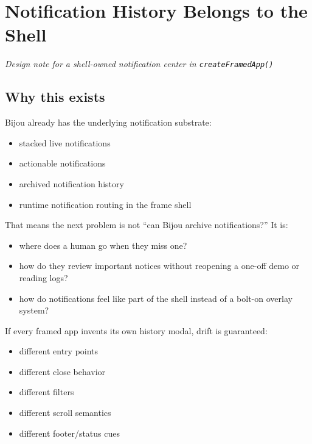 \chapter{Notification History Belongs to the Shell}\label{record-053}

\smallskip

\emph{Design note for a shell-owned notification center in \texttt{c\allowbreak{}r\allowbreak{}e\allowbreak{}a\allowbreak{}t\allowbreak{}e\allowbreak{}F\allowbreak{}r\allowbreak{}a\allowbreak{}m\allowbreak{}e\allowbreak{}d\allowbreak{}A\allowbreak{}p\allowbreak{}p\allowbreak{}(\allowbreak{})}}

\section{Why this exists}\label{record-053-why-this-exists}

Bijou already has the underlying notification substrate:

\begin{itemize}
\tightlist
\item
  stacked live notifications
\item
  actionable notifications
\item
  archived notification history
\item
  runtime notification routing in the frame shell
\end{itemize}

That means the next problem is not ``can Bijou archive notifications?'' It is:

\begin{itemize}
\tightlist
\item
  where does a human go when they miss one?
\item
  how do they review important notices without reopening a one-off demo or reading logs?
\item
  how do notifications feel like part of the shell instead of a bolt-on overlay system?
\end{itemize}

If every framed app invents its own history modal, drift is guaranteed:

\begin{itemize}
\tightlist
\item
  different entry points
\item
  different close behavior
\item
  different filters
\item
  different scroll semantics
\item
  different footer/status cues
\end{itemize}


